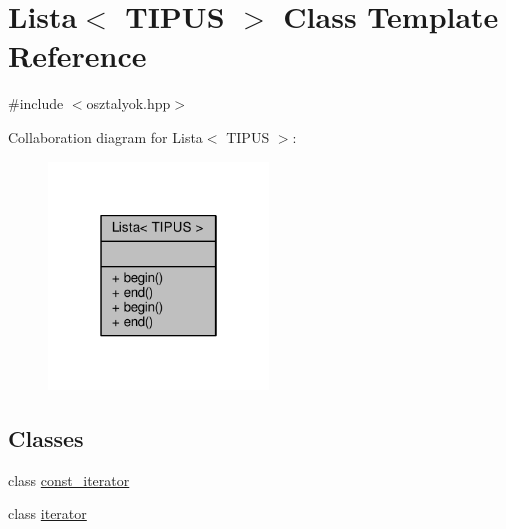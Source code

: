 \hypertarget{class_lista}{}\section{Lista$<$ T\+I\+P\+US $>$ Class Template Reference}
\label{class_lista}


{\ttfamily \#include $<$osztalyok.\+hpp$>$}



Collaboration diagram for Lista$<$ T\+I\+P\+US $>$\+:
\nopagebreak
\begin{figure}[H]
\begin{center}
\leavevmode
\includegraphics[width=166pt]{class_lista__coll__graph}
\end{center}
\end{figure}
\subsection*{Classes}
\begin{DoxyCompactItemize}
\item 
class \hyperlink{class_lista_1_1const__iterator}{const\+\_\+iterator}
\item 
class \hyperlink{class_lista_1_1iterator}{iterator}
\end{DoxyCompactItemize}
